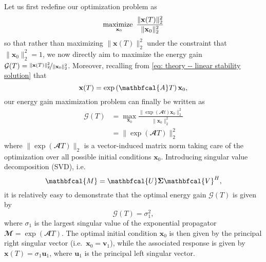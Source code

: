       Let us first redefine our optimization problem as
      \begin{equation}
        \maximize_{\mathbf{x}_0} \displaystyle \frac{\| \mathbf{x}(T) \|_2^2}{\| \mathbf{x}_0 \|_2^2}
        \label{eq: theory -- energy gain}
      \end{equation}
      so that rather than maximizing $\| \mathbf{x}(T) \|_2^2$ under the constraint that $\| \mathbf{x}_0 \|_2^2 = 1$, we now directly aim to maximize the energy gain $\mathcal{G}(T) = \nicefrac{\| \mathbf{x}(T) \|_2^2}{\| \mathbf{x}_0 \|_2^2}$. Moreover, recalling from \eqref{eq: theory -- linear stability solution} that
      \begin{equation}
        \mathbf{x}(T) = \exp \left( \mathbfcal{A} T \right) \mathbf{x}_0,
        \notag
      \end{equation}
      our energy gain maximization problem can finally be written as
      \begin{equation}
        \begin{aligned}
          \mathcal{G}(T) & = \max_{\mathbf{x}_0} \displaystyle \frac{\| \exp \left( \mathbfcal{A} t \right) \mathbf{x}_0 \|_2^2}{\| \mathbf{x}_0 \|_2^2} \\
          & = \| \exp \left( \mathbfcal{A} T \right) \|_2^2
        \end{aligned}
      \end{equation}
      where $\| \exp \left( \mathbfcal{A} T \right) \|_2$ is a vector-induced matrix norm taking care of the optimization over all possible initial conditions $\mathbf{x}_0$. Introducing singular value decomposition (SVD), i.e.\
      \begin{equation}
        \mathbfcal{M} = \mathbfcal{U} \boldsymbol{\Sigma} \mathbfcal{V}^H,
        \notag
      \end{equation}
      it is relatively easy to demonstrate that the optimal energy gain $\mathcal{G}(T)$ is given by
      \begin{equation}
        \mathcal{G}(T) = \sigma_1^2,
        \label{theory -- optimal energy gain }
      \end{equation}
      where $\sigma_1$ is the largest singular value of the exponential propagator $\mathbfcal{M} = \exp \left( \mathbfcal{A} T \right)$. The optimal initial condition $\mathbf{x}_0$ is then given by the principal right singular vector (i.e.\ $\mathbf{x}_0 = \mathbf{v}_1$), while the associated response is given by $\mathbf{x}(T) = \sigma_1 \mathbf{u}_1$, where $\mathbf{u}_1$ is the principal left singular vector.

